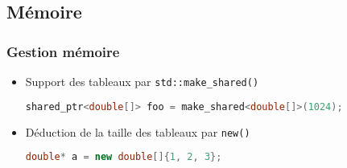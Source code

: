 \documentclass[C++.tex]{subfiles}
\begin{document}
\subsection*{Mémoire}
\begin{frame}[fragile]
	\frametitle{Gestion mémoire}
	\begin{itemize}
		\item Support des tableaux par \lstinline|std::make_shared()|

\begin{lstlisting}[language=C++]
shared_ptr<double[]> foo = make_shared<double[]>(1024);\end{lstlisting}

		\item Déduction de la taille des tableaux par \lstinline|new()|

		\begin{lstlisting}[language=C++]
double* a = new double[]{1, 2, 3};\end{lstlisting}
	\end{itemize}
\end{frame}
\end{document}
